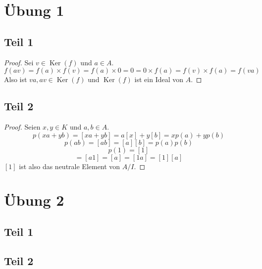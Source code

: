 \documentclass[10pt,a4paper]{article}
\DeclareMathOperator{\Ker}{Ker}
\begin{document}
\section*{Übung 1}

\subsection*{Teil 1}

\begin{proof}
Sei $v \in \Ker(f)$ und $a \in A$.
\begin{equation}
f(av) = f(a) \times f(v) = f(a) \times 0 = 0 = 0 \times f(a) = f(v) \times f(a) = f(va)
\end{equation}
Also ist $va, av \in \Ker(f)$ und $\Ker(f)$ ist ein Ideal von $A$.
\end{proof}

\subsection*{Teil 2}

\begin{proof}
Seien $x, y \in K$ und $a, b \in A$.
\begin{equation}
p(xa + yb) = [xa + yb] = a[x] + y[b] = xp(a) + yp(b)
\end{equation}
\begin{equation}
p(ab) = [ab] = [a][b] = p(a) p(b)
\end{equation}
\begin{equation}
p(1) = [1]
\end{equation}
\begin{equation}
[a][1] = [a1] = [a] = [1a] = [1][a]
\end{equation}
$[1]$ ist also das neutrale Element von $A/I$.
\end{proof}

\section*{Übung 2}

\subsection*{Teil 1}

\subsection*{Teil 2}
\end{document}
